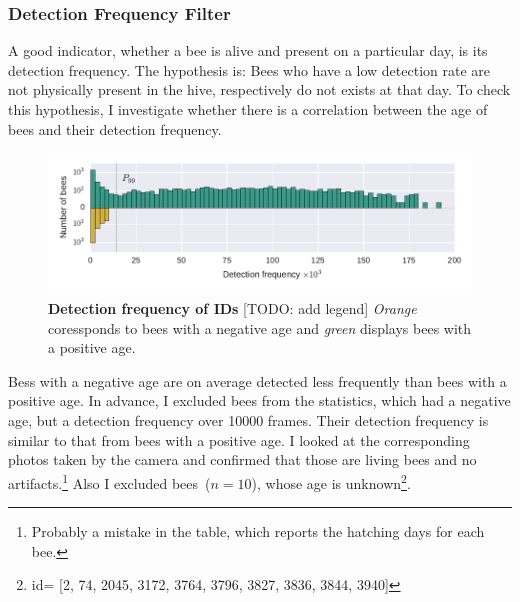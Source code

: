 

\subsubsection{Detection Frequency Filter}
A good indicator, whether a bee is alive and present on a particular day, is its detection frequency. The hypothesis is: Bees who have a low detection rate are not physically present in the hive, respectively do not exists at that day.
To check this hypothesis, I investigate whether there is a correlation between the age of bees and their detection frequency.

\begin{figure}[t]
	\centering
	\includegraphics[width=1.0\textwidth]{Figures/filter}
	\caption[Detection frequency of IDs]{\textbf{Detection frequency of IDs} [TODO: add legend] \emph{Orange} coressponds to bees with a negative age and \emph{green} displays bees with a positive age.\protect\footnotemark}
	\label{fig:filter}
\end{figure}


Bess with a negative age are on average detected less frequently than bees with a positive age.
In advance, I excluded bees from the statistics, which had a negative age, but a detection frequency over 10000 frames. Their detection frequency is similar to that from bees with a positive age. I looked at the corresponding photos taken by the camera and confirmed that those are living bees and no artifacts.\footnote{Probably a mistake in the table, which reports the hatching days for each bee.}
Also I excluded bees~($n=10$), whose age is unknown\footnote{id= [2,
    74,
    2045,
    3172,
    3764,
    3796,
    3827,
    3836,
    3844,
    3940]}.


